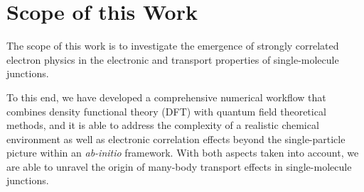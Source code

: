 \documentclass[aps,prx,twocolumn,superscriptaddress]{revtex4-2}
\begin{document}






\section{Scope of this Work}\label{sec:scope}
The scope of this work is to investigate the emergence of strongly correlated electron physics 
in the electronic and transport properties of single-molecule junctions. 

To this end, we have developed
a comprehensive numerical workflow that combines 
density functional theory (DFT) with quantum field theoretical methods, 
and it is able to address the complexity of a realistic chemical environment 
as well as electronic correlation effects beyond the single-particle picture 
within an \emph{ab-initio} framework.  
With both aspects taken into account, we are able to
unravel the origin of many-body transport effects in
single-molecule junctions.
\end{document}

